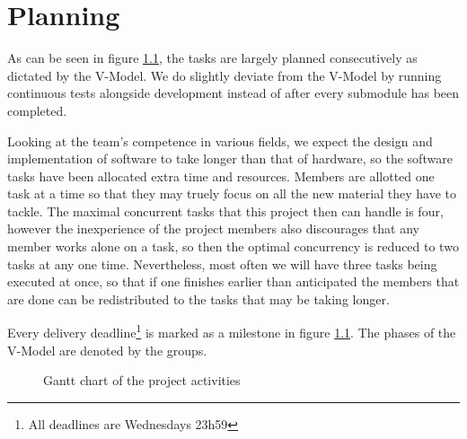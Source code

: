 \chapter{Planning}
As can be seen in figure \ref{fig:gantt}, the tasks are largely planned consecutively as dictated by the V-Model\cite{vmodel}. We do slightly deviate from the V-Model by running continuous tests alongside development instead of after every submodule has been completed.

Looking at the team's competence in various fields, we expect the design and implementation of software to take longer than that of hardware, so the software tasks have been allocated extra time and resources. Members are allotted one task at a time so that they may truely focus on all the new material they have to tackle. The maximal concurrent tasks that this project then can handle is four, however the inexperience of the project members also discourages that any member works alone on a task, so then the optimal concurrency is reduced to two tasks at any one time. Nevertheless, most often we will have three tasks being executed at once, so that if one finishes earlier than anticipated the members that are done can be redistributed to the tasks that may be taking longer.

Every delivery deadline\footnote{All deadlines are Wednesdays 23h59} is marked as a milestone in figure \ref{fig:gantt}. The phases of the V-Model are denoted by the groups.

\begin{figure}[hpb]
\centering
\begin{gantt}{19}{8}
	\begin{ganttitle}
	\end{ganttitle}




\end{gantt}
\caption{Gantt chart of the project activities}
\label{fig:gantt}
\end{figure}

